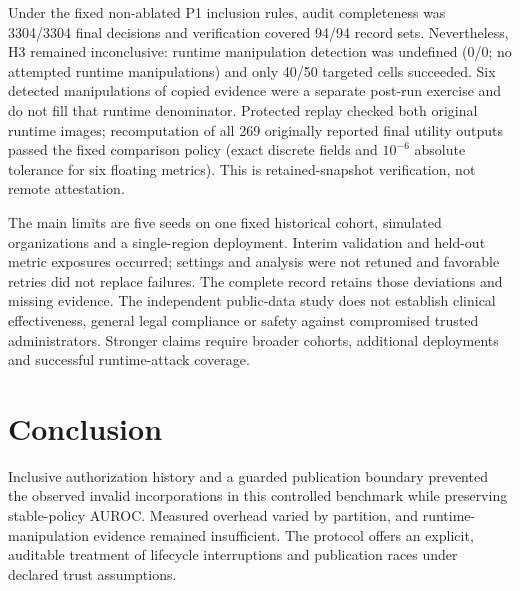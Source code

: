 \documentclass[conference,letterpaper]{IEEEtran}
\begin{document}
Under the fixed non-ablated P1 inclusion rules, audit completeness was 3304/3304 final decisions and verification covered 94/94 record sets. Nevertheless, H3 remained inconclusive: runtime manipulation detection was undefined (0/0; no attempted runtime manipulations) and only 40/50 targeted cells succeeded. Six detected manipulations of copied evidence were a separate post-run exercise and do not fill that runtime denominator. Protected replay checked both original runtime images; recomputation of all 269 originally reported final utility outputs passed the fixed comparison policy (exact discrete fields and $10^{-6}$ absolute tolerance for six floating metrics). This is retained-snapshot verification, not remote attestation.

The main limits are five seeds on one fixed historical cohort, simulated organizations and a single-region deployment. Interim validation and held-out metric exposures occurred; settings and analysis were not retuned and favorable retries did not replace failures. The complete record retains those deviations and missing evidence. The independent public-data study does not establish clinical effectiveness, general legal compliance or safety against compromised trusted administrators. Stronger claims require broader cohorts, additional deployments and successful runtime-attack coverage.

\section{Conclusion}
Inclusive authorization history and a guarded publication boundary prevented the observed invalid incorporations in this controlled benchmark while preserving stable-policy AUROC. Measured overhead varied by partition, and runtime-manipulation evidence remained insufficient. The protocol offers an explicit, auditable treatment of lifecycle interruptions and publication races under declared trust assumptions.
\end{document}

